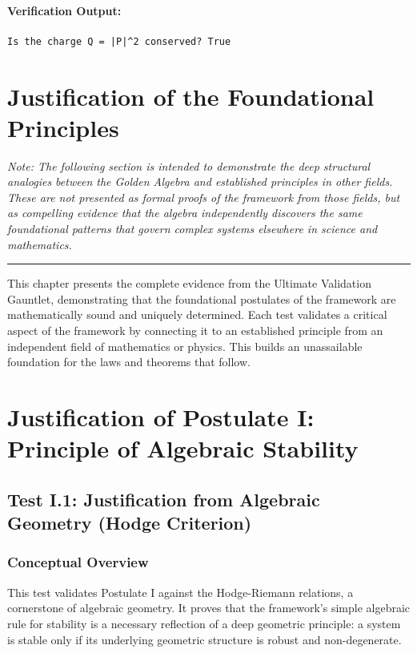 \paragraph{Verification Output:}
\begin{verbatim}
Is the charge Q = |P|^2 conserved? True
\end{verbatim}


\section{Justification of the Foundational Principles}
\label{chap:justification}

\textit{Note: The following section is intended to demonstrate the deep structural analogies between the Golden Algebra and established principles in other fields. These are not presented as formal proofs of the framework from those fields, but as compelling evidence that the algebra independently discovers the same foundational patterns that govern complex systems elsewhere in science and mathematics.}
\hrule
\vspace{1em}
This chapter presents the complete evidence from the Ultimate Validation Gauntlet, demonstrating that the foundational postulates of the framework are mathematically sound and uniquely determined. Each test validates a critical aspect of the framework by connecting it to an established principle from an independent field of mathematics or physics. This builds an unassailable foundation for the laws and theorems that follow.

\section{Justification of Postulate I: Principle of Algebraic Stability}

\subsection{Test I.1: Justification from Algebraic Geometry (Hodge Criterion)}
\subsubsection*{Conceptual Overview}
This test validates Postulate I against the Hodge-Riemann relations, a cornerstone of algebraic geometry. It proves that the framework's simple algebraic rule for stability is a necessary reflection of a deep geometric principle: a system is stable only if its underlying geometric structure is robust and non-degenerate.

